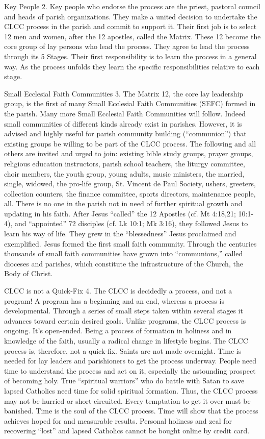 \documentclass[oneside]{book}
\begin{document}
Key People
2. Key people who endorse the process are the priest, pastoral council and heads
of parish organizations. They make a united decision to undertake the CLCC
process in the parish and commit to support it.
Their first job is to select 12 men and women, after the 12 apostles, called the
Matrix. These 12 become the core group of lay persons who lead the process. They
agree to lead the process through its 5 Stages. Their first responsibility is to
learn the process in a general way. As the process unfolds they learn the
specific responsibilities relative to each stage.

Small Ecclesial Faith Communities
3. The Matrix 12, the core lay leadership group, is the first of many Small
Ecclesial Faith Communities (SEFC) formed in the parish. Many more Small
Ecclesial Faith Communities will follow. Indeed small communities of different
kinds already exist in parishes. However, it is advised and highly useful for
parish community building (``communion'') that existing groups be willing to be
part of the CLCC process. The following and all others are invited and urged to
join: existing bible study groups, prayer groups, religious education
instructors, parish school teachers, the liturgy committee, choir members, the
youth group, young adults, music ministers, the married, single, widowed, the
pro-life group, St. Vincent de Paul Society, ushers, greeters, collection
counters, the finance committee, sports directors, maintenance people,
all. There is no one in the parish not in need of further spiritual growth and
updating in his faith. After Jesus ``called'' the 12 Apostles (cf. Mt 4:18,21;
10:1-4), and ``appointed'' 72 disciples (cf. Lk 10:1; Mk 3:16), they followed
Jesus to learn his way of life. They grew in the ``blessedness'' Jesus
proclaimed and exemplified. Jesus formed the first small faith
community. Through the centuries thousands of small faith communities have grown
into ``communions,'' called dioceses and parishes, which constitute the
infrastructure of the Church, the Body of Christ.

CLCC is not a Quick-Fix
4. The CLCC is decidedly a process, and not a program! A program has a beginning
and an end, whereas a process is developmental. Through a series of small steps
taken within several stages it advances toward certain desired goals. Unlike
programs, the CLCC process is ongoing. It's open-ended. Being a process of
formation in holiness and in knowledge of the faith, usually a radical change in
lifestyle begins. The CLCC process is, therefore, not a quick-fix. Saints are
not made overnight. Time is needed for lay leaders and parishioners to get the
process underway. People need time to understand the process and act on it,
especially the astounding prospect of becoming holy. True ``spiritual warriors''
who do battle with Satan to save lapsed Catholics need time for solid spiritual
formation. Thus, the CLCC process may not be hurried or short-circuited. Every
temptation to get it over must be banished. Time is the soul of the CLCC
process. Time will show that the process achieves hoped for and measurable
results. Personal holiness and zeal for recovering ``lost'' and lapsed Catholics
cannot be bought online by credit card.
\end{document}
